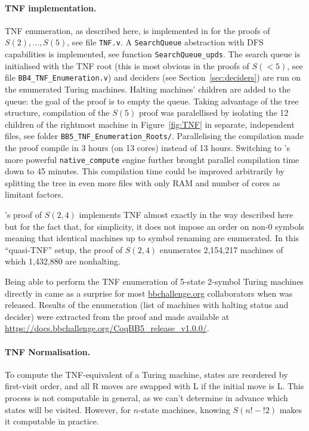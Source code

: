 \paragraph{\CoqBB TNF implementation.} TNF enumeration, as described here, is implemented in \CoqBB for the proofs of $S(2),\dots,S(5)$, see file \texttt{TNF.v}. A \texttt{SearchQueue} abstraction with DFS capabilities is implemented, see function \texttt{SearchQueue\_upds}. The search queue is initialised with the TNF root (this is most obvious in the proofs of $S(<5)$, \eg see file \texttt{BB4\_TNF\_Enumeration.v}) and deciders (see Section~\ref{sec:deciders}) are run on the enumerated Turing machines. Halting machines' children are added to the queue: the goal of the proof is to empty the queue. Taking advantage of the tree structure, compilation of the $S(5)$ proof was paralellised by isolating the 12 children of the rightmost machine in Figure~\ref{fig:TNF} in separate, independent files, see folder \texttt{BB5\_TNF\_Enumeration\_Roots/}. Parallelising the compilation made the proof compile in 3 hours (on 13 cores) instead of 13 hours. Switching to \Coq's more powerful \texttt{native\_compute} engine \cite{nativecompute} further brought parallel compilation time down to 45 minutes. This compilation time could be improved arbitrarily by splitting the tree in even more files with only RAM and number of cores as limitant factors.

\CoqBB's proof of $S(2,4)$ implements TNF almost exactly in the way described here but for the fact that, for simplicity, it does not impose an order on non-0 symbols meaning that identical machines up to symbol renaming are enumerated. In this ``quasi-TNF'' setup, the proof of $S(2,4)$ enumerates 2,154,217 machines of which 1,432,880 are nonhalting.

Being able to perform the TNF enumeration of 5-state 2-symbol Turing machines directly in \Coq came as a surprise for most \url{bbchallenge.org} collaborators when \CoqBB was released. Results of the enumeration (\ie list of machines with halting status and decider) were extracted from the proof and made available at \url{https://docs.bbchallenge.org/CoqBB5_release_v1.0.0/}.




\paragraph{TNF Normalisation.} To compute the TNF-equivalent of a Turing machine, states are reordered by first-visit order, and all R moves are swapped with L if the initial move is L. This process is not computable in general, as we can't determine in advance which states will be visited. However, for $n$-state machines, knowing $S(n!-!2)$ makes it computable in practice. %